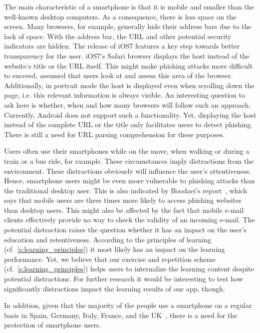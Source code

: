 \begin{description}[leftmargin=0cm]
\item[Mobility and Size:] The main characteristic of a smartphone is that it is mobile and smaller than the well-known desktop computers.
As a consequence, there is less space on the screen.
Many browsers, for example, generally hide their address bars due to the lack of space.
With the address bar, the URL and other potential security indicators are hidden.
The release of iOS7 features a key step towards better transparency for the user.
iOS7's Safari browser displays the host instead of the website's title or the URL itself.
This might make phishing attacks more difficult to succeed, assumed that users look at and assess this area of the browser.
Additionally, in portrait mode the host is displayed even when scrolling down the page, i.e. this relevant information is always visible.
An interesting question to ask here is whether, when and how many browsers will follow such an approach.
Currently, Android does not support such a functionality. 
Yet, displaying the host instead of the complete URL or the title only facilitates users to detect phishing.
There is still a need for URL parsing comprehension for these purposes.
\item[Distraction Caused by Mobility:] Users often use their smartphones while on the move, when walking or during a train or a bus ride, for example.
These circumstances imply distractions from the environment.
These distractions obviously will influence the user's attentiveness.
Hence, smartphone users might be even more vulnerable to phishing attacks than the traditional desktop user.
This is also indicated by Boodaei's report~\cite{trusteer2011}, which says that mobile users are three times more likely to access phishing websites than desktop users.
This might also be affected by the fact that mobile e-mail clients effectively provide no way to check the validity of an incoming e-mail.
The potential distraction raises the question whether it has an impact on the user's education and retentiveness.
According to the principles of learning (cf.~\autoref{s:learning_principles}) it most likely has an impact on the learning performance.
Yet, we believe that our exercise and repetition scheme (cf.~\autoref{s:learning_principles}) helps users to internalize the learning content despite potential distractions.
For further research it would be interesting to test how significantly distractions impact the learning results of our app, though.
\item[High Number of Smartphone Users:] In addition, given that the majority of the people use a smartphone on a regular basis in Spain, Germany, Italy, France, and the UK~\cite{smartphoneusage}, there is a need for the protection of smartphone users.

\end{description} 
